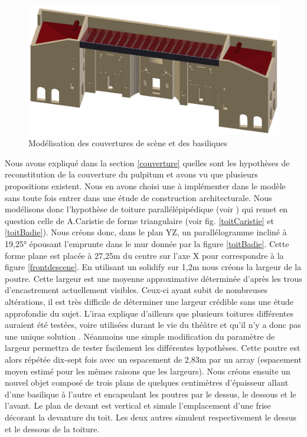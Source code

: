 \begin{figure}[!h]
	\includegraphics[width=\linewidth]{images/modCouvertures}
	\caption{Modélisation des couvertures de scène et des basiliques} 
	\label{modCouvertures} 
\end{figure} 
Nous avons expliqué dans la section \ref{couverture} quelles sont les hypothèses de reconstitution de la couverture du pulpitum et avons vu que plusieurs propositions existent. Nous en avons choisi une à implémenter dans le modèle sans toute fois entrer dans une étude de construction architecturale. Nous modélisons donc l'hypothèse de toiture parallélépipédique (voir \cite[Chap. I, sect. 6]{orangeTxt}) qui remet en question celle de A.Caristie de forme triangulaire (voir fig. \ref{toitCaristie} et \ref{toitBadie}). Nous créons donc, dans le plan YZ, un parallélogramme incliné à 19,25° épousant l'emprunte dans le mur donnée par la figure \ref{toitBadie}. Cette forme plane est placée à 27,25m du centre sur l'axe X pour correspondre à la figure \ref{frontdescene}. En utilisant un \gls{solidify} sur 1,2m nous créons la largeur de la poutre. Cette largeur est une moyenne approximative déterminée d'après les trous d'encastrement actuellement visibles. Ceux-ci ayant subit de nombreuses altérations, il est très difficile de déterminer une largeur crédible sans une étude approfondie du sujet. L'\gls{iraa} explique d'ailleurs que plusieurs toitures différentes auraient été testées, voire utilisées durant le vie du théâtre et qu'il n'y a donc pas une unique solution \cite[p. 34]{orangeTxt}. Néanmoins une simple modification du paramètre de largeur permettra de tester facilement les différentes hypothèses. Cette poutre est alors répétée dix-sept fois avec un espacement de 2,83m par un \gls{array} (espacement moyen estimé pour les mêmes raisons que les largeurs). Nous créons ensuite un nouvel objet composé de trois plans de quelques centimètres d'épaisseur allant d'une basilique à l'autre et encapsulant les poutres par le dessus, le dessous et le l'avant. Le plan de devant est vertical et simule l'emplacement d'une frise décorant la devanture du toit. Les deux autres simulent respectivement le dessus et le dessous de la toiture.

